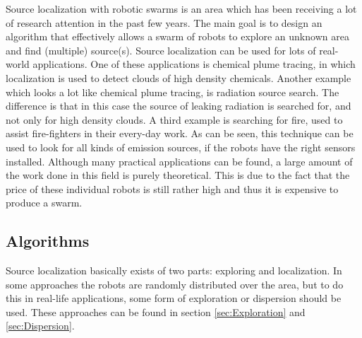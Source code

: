 
Source localization with robotic swarms is an area which has been receiving a lot of research attention in the past few years. 
The main goal is to design an algorithm that effectively allows a swarm of robots to explore an unknown area and find (multiple) source(s).
Source localization can be used for lots of real-world applications.
One of these applications is chemical plume tracing, in which localization is used to detect clouds of high density chemicals. \cite{zarzhitsky2005distributed}
Another example which looks a lot like chemical plume tracing, is radiation source search. \cite{bashyal2008human} 
The difference is that in this case the source of leaking radiation is searched for, and not only for high density clouds. 
A third example is searching for fire, used to assist fire-fighters in their every-day work. \cite{marjovi2009multi}
As can be seen, this technique can be used to look for all kinds of emission sources, if the robots have the right sensors installed. \cite{cui2004swarm}
Although many practical applications can be found, a large amount of the work done in this field is purely theoretical.
This is due to the fact that the price of these individual robots is still rather high and thus it is expensive to produce a swarm.


\subsection{Algorithms}
Source localization basically exists of two parts: exploring and localization.
In some approaches the robots are randomly distributed over the area, but to do this in real-life applications, some form of exploration or dispersion should be used.
These approaches can be found in section \ref{sec:Exploration} and \ref{sec:Dispersion}.

